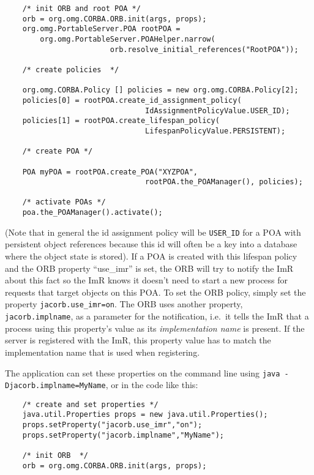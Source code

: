 \documentclass[12pt]{scrbook}
\begin{document}
\small{
\begin{verbatim}
    /* init ORB and root POA */
    orb = org.omg.CORBA.ORB.init(args, props);
    org.omg.PortableServer.POA rootPOA =
        org.omg.PortableServer.POAHelper.narrow(
                        orb.resolve_initial_references("RootPOA"));

    /* create policies  */

    org.omg.CORBA.Policy [] policies = new org.omg.CORBA.Policy[2];
    policies[0] = rootPOA.create_id_assignment_policy(
                                IdAssignmentPolicyValue.USER_ID);
    policies[1] = rootPOA.create_lifespan_policy(
                                LifespanPolicyValue.PERSISTENT);

    /* create POA */

    POA myPOA = rootPOA.create_POA("XYZPOA",
                                rootPOA.the_POAManager(), policies);

    /* activate POAs */
    poa.the_POAManager().activate();

\end{verbatim}
}

(Note that in general the  id assignment policy will be {\tt USER\_ID}
for a POA with persistent object references because this id will often
be a key into  a database where the object state is  stored). If a POA
is created with this lifespan policy and the ORB property ``use\_imr''
is set, the ORB will try to  notify the ImR about this fact so the ImR
knows it doesn't need to start  a new process for requests that target
objects on this  POA.  To set the ORB policy,  simply set the property
{\tt  jacorb.use\_imr=on}.   The   ORB  uses  another  property,  {\tt
jacorb.implname}, as  a parameter for the  notification, i.e.~it tells
the  ImR  that a  process  using this  property's  value  as its  {\em
implementation name} is present. If  the server is registered with the
ImR, this property value has  to match the implementation name that is
used when registering.

The application  can set  these properties on  the command  line using
{\tt java -Djacorb.implname=MyName}, or in the code like this:

\small{
\begin{verbatim}
    /* create and set properties */
    java.util.Properties props = new java.util.Properties();
    props.setProperty("jacorb.use_imr","on");
    props.setProperty("jacorb.implname","MyName");

    /* init ORB  */
    orb = org.omg.CORBA.ORB.init(args, props);
\end{verbatim}
}
\end{document}
